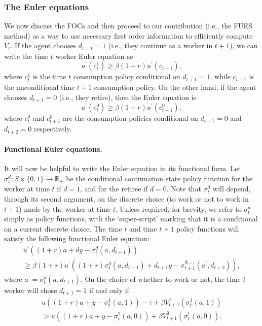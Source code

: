 \documentclass[12pt]{article}
\begin{document}

\subsubsection{The Euler equations}

We now discuss the FOCs and then proceed to our contribution (i.e., the FUES method) as a way to use necessary first order information to efficiently compute $V_{t}$. If the agent chooses $d_{t+1} =1$ (i.e., they continue as a worker in $t+1$), we can write the time $t$ worker Euler equation as
%
\begin{equation*}
    u^{\prime}(c_{t}^{1}) \geq  \beta (1+r) u^{\prime}(c_{t+1}),
\end{equation*}
%
where $c_{t}^{1}$ is the time $t$ consumption policy conditional on $d_{t+1} =1$, while $c_{t+1}$ is the unconditional time $t+1$ consumption policy. On the other hand, if the agent chooses $d_{t+1} = 0$ (i.e., they retire), then the Euler equation is
%
\begin{equation*}
    u^{\prime}(c_{t}^{0}) \geq \beta (1+r) u^{\prime}(c_{t+1}^{0}), 
\end{equation*}
where $c_{t}^{0}$ and $c_{t+1}^{0}$ are the consumption policies conditional on $d_{t+1} =0$ and $d_{t+2} = 0 $ respectively. 
%
\paragraph{Functional Euler equations.} It will now be helpful to write the Euler equation in its functional form. Let $\sigma_{t}^{d}\colon S\times \{0,1\}\rightarrow \mathbb{R}_{+}$ be the conditional continuation state policy function for the worker at time $t$ if $d=1$, and for the retiree if $d=0$. Note that $\sigma_{t}^{d}$ will depend, through its second argument, on the discrete choice (to work or not to work in $t+1$) made by the worker at time $t$. Unless required, for brevity, we refer to $\sigma_{t}^{d}$ simply as policy functions, with the `super-script' marking that it is a conditional on a current discrete choice. The time $t$ and time $t+1$ policy functions will satisfy the following functional Euler equation:
%
\begin{multline}\label{eq: Euler_func_ret_1}
    u^{\prime}((1+r)a + dy - \sigma^{d}_{t}(a,d_{t+1}))\\  \geq \beta (1+r) u^{\prime}((1+r)\sigma_{t}^{d}(a,d_{t+1}) + d_{t+1}y - \sigma_{t+1}^{d_{t+1}}(a^{\prime},d_{t+2})),
\end{multline}
%
where $a^{\prime}= \sigma_{t}^{d}(a,d_{t+1})$. 
%
On the choice of whether to work or not, the time $t$ worker will chose $d_{t+1} = 1$ if and only if
%
\begin{multline}\label{eq: disc_choice_t}
    u((1+r)a + y - \sigma_{t}^{1}(a, 1))  - \tau + \beta V_{t+1}^{1}(\sigma_{t}^{1}(a,1)) \\ > u((1+r)a + y- \sigma_{t}^{1}(a,0)) +  \beta V_{t+1}^{0}(\sigma_{t}^{1}(a,0)).
\end{multline}
\end{document}
